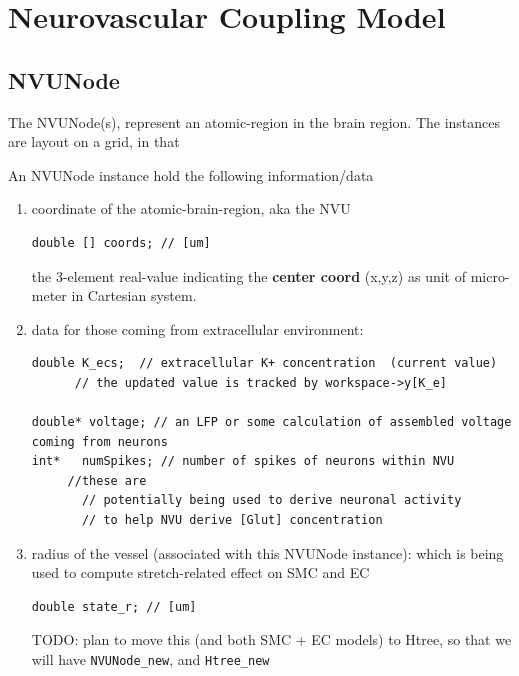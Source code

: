 \chapter{Neurovascular Coupling Model}

\section{NVUNode}
\label{sec:NVUNode}

The NVUNode(s), represent an atomic-region in the brain region.
The instances are layout on a grid, in that 


An NVUNode instance hold the following information/data

\begin{enumerate}
  \item coordinate of the atomic-brain-region, aka the NVU
  
\begin{verbatim}
double [] coords; // [um]
\end{verbatim}
  
  the 3-element real-value indicating the {\bf center coord} (x,y,z) as unit of
  micro-meter in Cartesian system.
  
  \item data for those coming from extracellular environment:
  
\begin{verbatim}
double K_ecs;  // extracellular K+ concentration  (current value)
      // the updated value is tracked by workspace->y[K_e]
      
double* voltage; // an LFP or some calculation of assembled voltage coming from neurons
int*   numSpikes; // number of spikes of neurons within NVU
     //these are
       // potentially being used to derive neuronal activity
       // to help NVU derive [Glut] concentration
\end{verbatim}  

  \item radius of the vessel (associated with this NVUNode instance): which is
  being used to compute stretch-related effect on SMC and EC
  
\begin{verbatim}
double state_r; // [um]
\end{verbatim}


TODO: plan to move this (and both SMC + EC models) to Htree, so that we will have 
\verb!NVUNode_new!, and \verb!Htree_new!


\end{enumerate}
